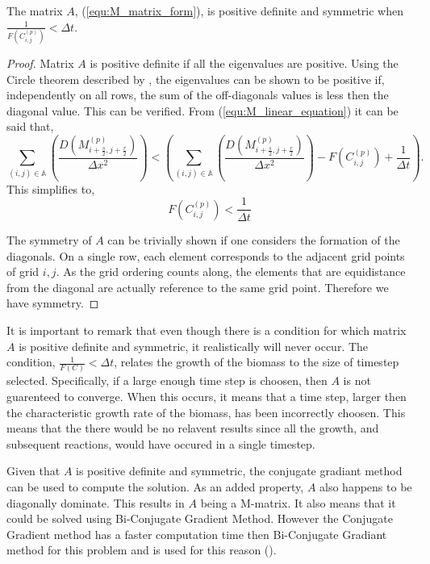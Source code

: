 \begin{prop}
  The matrix $A$, (\ref{equ:M_matrix_form}), is positive definite and symmetric when $\frac{1}{ F(C^{(p)}_{i,j}) } < \Delta t$.
\end{prop}
\begin{proof}
  Matrix $A$ is positive definite if all the eigenvalues are positive. 
  Using the Circle theorem described by \cite{gerschgorin1931uber_die_abgrenzung}, the eigenvalues can be shown to be positive if, independently on all rows, the sum of the off-diagonals values is less then the diagonal value.
  This can be verified. From (\ref{equ:M_linear_equation}) it can be said that,
  \begin{equation}
    \sum_{(i,j) \in \mathbb{A}} \left( \frac{D( M^{(p)}_{i+\frac{s}{2}, j+\frac{r}{2}} )}{\Delta x^2} \right)
     < \left( \sum_{(i,j) \in \mathbb{A}} \left( \frac{D( M^{(p)}_{i+\frac{s}{2}, j+\frac{r}{2}} )}{\Delta x^2} \right) 
    - F(C^{(p)}_{i,j}) + \frac{1}{\Delta t} \right). 
  \end{equation}
  This simplifies to,
  \begin{equation}
    F(C^{(p)}_{i,j}) < \frac{1}{\Delta t}
  \end{equation}

  The symmetry of $A$ can be trivially shown if one considers the formation of the diagonals.
  On a single row, each element corresponds to the adjacent grid points of grid $i,j$.
  As the grid ordering counts along, the elements that are equidistance from the diagonal are actually reference to the same grid point. 
  Therefore we have symmetry. 
\end{proof} 

It is important to remark that even though there is a condition for which matrix $A$ is positive definite and symmetric, it realistically will never occur.
The condition, $\frac{1}{F(C)} < \Delta t$, relates the growth of the biomass to the size of timestep selected.
Specifically, if a large enough time step is choosen, then $A$ is not guarenteed to converge.
When this occurs, it means that a time step, larger then the characteristic growth rate of the biomass, has been incorrectly choosen.
This means that the there would be no relavent results since all the growth, and subsequent reactions, would have occured in a single timestep.

Given that $A$ is positive definite and symmetric, the conjugate gradiant method can be used to compute the solution.
As an added property, $A$ also happens to be diagonally dominate.
This results in $A$ being a M-matrix.
It also means that it could be solved using Bi-Conjugate Gradient Method.
However the Conjugate Gradient method has a faster computation time then Bi-Conjugate Gradiant method for this problem and is used for this reason (\cite{barret1987templates}).

